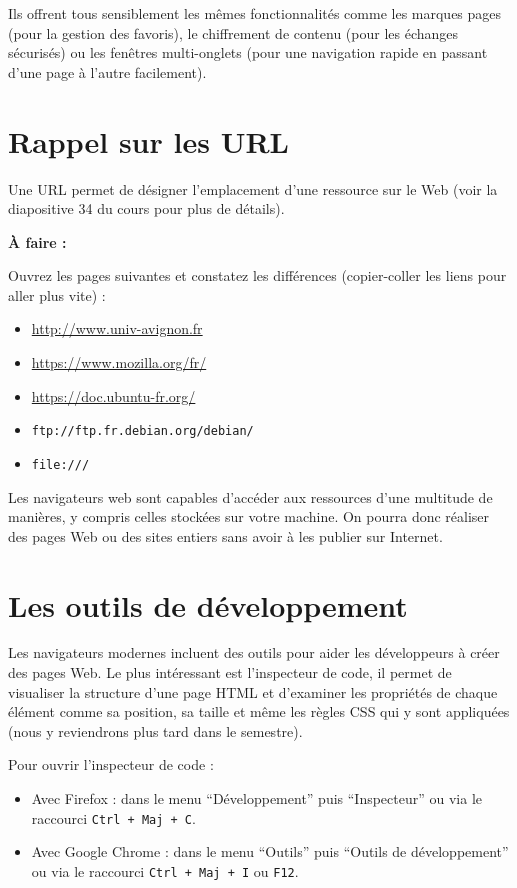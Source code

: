 \documentclass[11pt]{article}
\begin{document}
Ils offrent tous sensiblement les mêmes fonctionnalités comme les marques pages (pour la gestion des favoris), le chiffrement de contenu (pour les échanges sécurisés) ou les fenêtres multi-onglets (pour une navigation rapide en passant d'une page à l'autre facilement).

\section{Rappel sur les URL}

Une URL permet de désigner l'emplacement d'une ressource sur le Web (voir la diapositive 34 du cours pour plus de détails).

\begin{afaire}
\textbf{À faire :}

Ouvrez les pages suivantes et constatez les différences (copier-coller les liens pour aller plus vite) :

\begin{itemize}
    \item \url{http://www.univ-avignon.fr}
    \item \url{https://www.mozilla.org/fr/}
    \item \url{https://doc.ubuntu-fr.org/}
    \item \texttt{ftp://ftp.fr.debian.org/debian/}
    \item \texttt{file:///}
\end{itemize}
\end{afaire}

Les navigateurs web sont capables d'accéder aux ressources d'une multitude de manières, y compris celles stockées sur votre machine. On pourra donc réaliser des pages Web ou des sites entiers sans avoir à les publier sur Internet.

\section{Les outils de développement}

Les navigateurs modernes incluent des outils pour aider les développeurs à créer des pages Web. Le plus intéressant est l'inspecteur de code, il permet de visualiser la structure d'une page HTML et d'examiner les propriétés de chaque élément comme sa position, sa taille et même les règles CSS qui y sont appliquées (nous y reviendrons plus tard dans le semestre).

Pour ouvrir l'inspecteur de code :

\begin{itemize}
    \item Avec Firefox : dans le menu ``Développement'' puis ``Inspecteur'' ou via le raccourci \texttt{Ctrl + Maj + C}.
    \item Avec Google Chrome : dans le menu ``Outils'' puis ``Outils de développement'' ou via le raccourci \texttt{Ctrl + Maj + I} ou \texttt{F12}.
\end{itemize}
\end{document}
